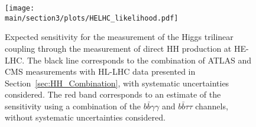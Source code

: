 \begin{figure}[!htb]
\centering 
\texttt{[image: \\main/section3/plots/HELHC\_likelihood.pdf]}
\caption{Expected sensitivity for the measurement of the Higgs trilinear coupling through the measurement of direct HH production at HE-LHC. The black line corresponds to the combination of ATLAS and CMS measurements with HL-LHC data presented in Section~\ref{sec:HH_Combination}, with systematic uncertainties considered. The red band corresponds to an estimate of the sensitivity using a combination of the $b\bar{b}\gamma\gamma$ and $b\bar{b}\tau\tau$ channels, without systematic uncertainties considered.} 
\label{fig:HH_HELHC_comb} 
\end{figure}
